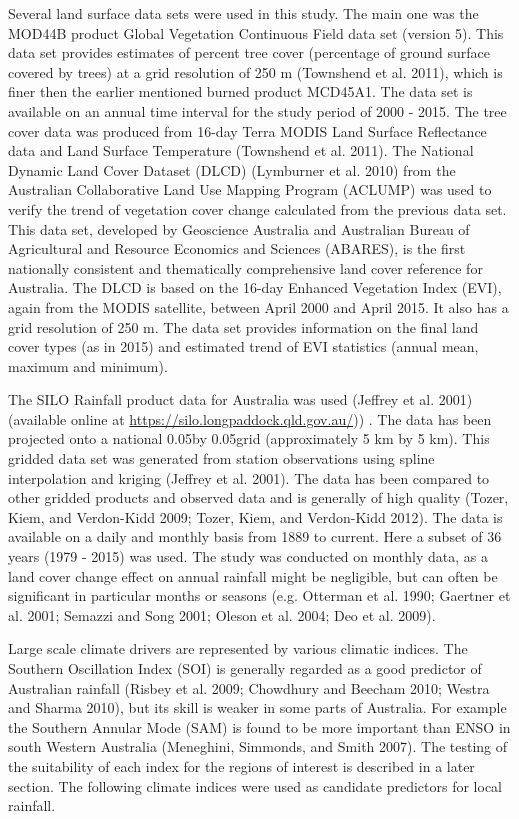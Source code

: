 \documentclass[fleqn,10pt,lineno]{wlpeerj} %
\begin{document}
Several land surface data sets were used in this study. The main one was
the MOD44B product Global Vegetation Continuous Field data set (version
5). This data set provides estimates of percent tree cover (percentage
of ground surface covered by trees) at a grid resolution of 250 m
(Townshend et al. 2011), which is finer then the earlier mentioned
burned product MCD45A1. The data set is available on an annual time
interval for the study period of 2000 - 2015. The tree cover data was
produced from 16-day Terra MODIS Land Surface Reflectance data and Land
Surface Temperature (Townshend et al. 2011). The National Dynamic Land
Cover Dataset (DLCD) (Lymburner et al. 2010) from the Australian
Collaborative Land Use Mapping Program (ACLUMP) was used to verify the
trend of vegetation cover change calculated from the previous data set.
This data set, developed by Geoscience Australia and Australian Bureau
of Agricultural and Resource Economics and Sciences (ABARES), is the
first nationally consistent and thematically comprehensive land cover
reference for Australia. The DLCD is based on the 16-day Enhanced
Vegetation Index (EVI), again from the MODIS satellite, between April
2000 and April 2015. It also has a grid resolution of 250 m. The data
set provides information on the final land cover types (as in 2015) and
estimated trend of EVI statistics (annual mean, maximum and minimum).

The SILO Rainfall product data for Australia was used (Jeffrey et al.
2001) (available online at \url{https://silo.longpaddock.qld.gov.au/}))
. The data has been projected onto a national 0.05\textdegree by
0.05\textdegree grid (approximately 5 km by 5 km). This gridded data set
was generated from station observations using spline interpolation and
kriging (Jeffrey et al. 2001). The data has been compared to other
gridded products and observed data and is generally of high quality
(Tozer, Kiem, and Verdon-Kidd 2009; Tozer, Kiem, and Verdon-Kidd 2012).
The data is available on a daily and monthly basis from 1889 to current.
Here a subset of 36 years (1979 - 2015) was used. The study was
conducted on monthly data, as a land cover change effect on annual
rainfall might be negligible, but can often be significant in particular
months or seasons (e.g. Otterman et al. 1990; Gaertner et al. 2001;
Semazzi and Song 2001; Oleson et al. 2004; Deo et al. 2009).

Large scale climate drivers are represented by various climatic indices.
The Southern Oscillation Index (SOI) is generally regarded as a good
predictor of Australian rainfall (Risbey et al. 2009; Chowdhury and
Beecham 2010; Westra and Sharma 2010), but its skill is weaker in some
parts of Australia. For example the Southern Annular Mode (SAM) is found
to be more important than ENSO in south Western Australia (Meneghini,
Simmonds, and Smith 2007). The testing of the suitability of each index
for the regions of interest is described in a later section. The
following climate indices were used as candidate predictors for local
rainfall.
\end{document}
